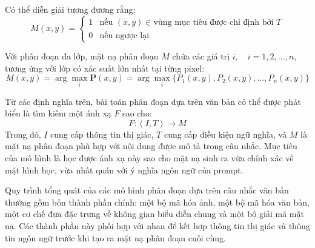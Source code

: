 \begin{itemize}
    Có thể diễn giải tương đương rằng:
    \[
    M(x, y) =
        \begin{cases}
        1 & \text{nếu } (x, y) \in \text{vùng mục tiêu được chỉ định bởi } T \\
        0 & \text{nếu ngược lại}
        \end{cases}
    \]

    Với phân đoạn đa lớp, mặt nạ phân đoạn $M$ chứa các giá trị $i, \quad i = 1, 2, \dots, n$, tương ứng với lớp có xác suất lớn nhất tại từng pixel:
    \[
    M(x, y) = \arg\max_i \mathbf{P}(x,y) = \arg\max_i \{P_1(x,y), P_2(x,y), \dots, P_n(x,y)\}
    \]
\end{itemize}

Từ các định nghĩa trên, bài toán phân đoạn dựa trên văn bản có thể được phát biểu là tìm kiếm một ánh xạ $F$ sao cho:
    \[
        F: (I, T) \rightarrow M
    \]
Trong đó, $I$ cung cấp thông tin thị giác, $T$ cung cấp điều kiện ngữ nghĩa, và $M$ là mặt nạ phân đoạn phù hợp với nội dung được mô tả trong câu nhắc. Mục tiêu của mô hình là học được ánh xạ này sao cho mặt nạ sinh ra vừa chính xác về mặt hình học, vừa nhất quán với ý nghĩa ngôn ngữ của prompt.

Quy trình tổng quát của các mô hình phân đoạn dựa trên câu nhắc văn bản thường gồm bốn thành phần chính: một bộ mã hóa ảnh, một bộ mã hóa văn bản, một cơ chế đưa đặc trưng về không gian biểu diễn chung và một bộ giải mã mặt nạ. Các thành phần này phối hợp với nhau để kết hợp thông tin thị giác và thông tin ngôn ngữ trước khi tạo ra mặt nạ phân đoạn cuối cùng.

